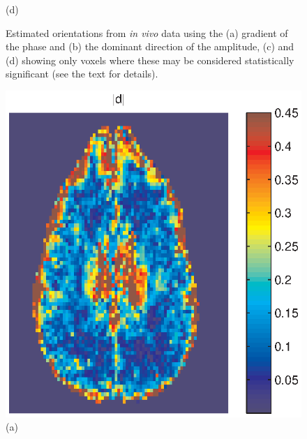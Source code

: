 \documentclass[authoryear,preprint,12pt]{elsarticle}
\begin{document}
\begin{figure}[p]
\begin{center}
\begin{minipage}[]{0.42\textwidth}
      (d)
    \end{minipage}
  \end{center}
  \caption{Estimated orientations from \textit{in vivo} data using the
    (a) gradient of the phase and (b) the dominant direction of the
    amplitude, (c) and (d) showing only voxels where these may be
    considered statistically significant (see the text for details).}
  \label{fig1c} 
\end{figure}

\begin{figure}[p]
  \begin{center}
    \begin{minipage}[]{.30\textwidth}
      \centering
      \includegraphics[width=\textwidth]{absd.eps}
      (a)
      \end{minipage}
      \begin{minipage}[]{.30\textwidth}
      \centering

\end{minipage}
\end{center}
\end{figure}
\end{document}
